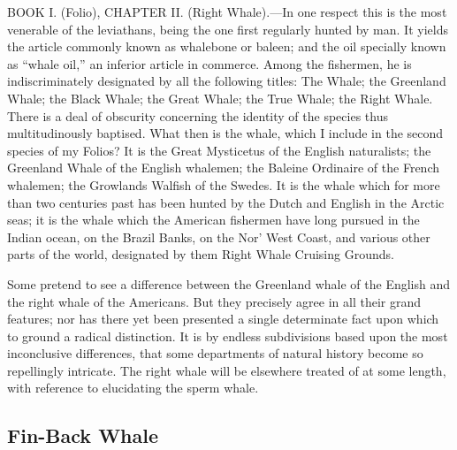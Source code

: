 BOOK I. (Folio), CHAPTER II. (Right Whale).—In one respect this is the most venerable of the leviathans, being the one first regularly hunted by man. It yields the article commonly known as whalebone or baleen; and the oil specially known as “whale oil,” an inferior article in commerce. Among the fishermen, he is indiscriminately designated by all the following titles: The Whale; the Greenland Whale; the Black Whale; the Great Whale; the True Whale; the Right Whale. There is a deal of obscurity concerning the identity of the species thus multitudinously baptised. What then is the whale, which I include in the second species of my Folios? It is the Great Mysticetus of the English naturalists; the Greenland Whale of the English whalemen; the Baleine Ordinaire of the French whalemen; the Growlands Walfish of the Swedes. It is the whale which for more than two centuries past has been hunted by the Dutch and English in the Arctic seas; it is the whale which the American fishermen have long pursued in the Indian ocean, on the Brazil Banks, on the Nor’ West Coast, and various other parts of the world, designated by them Right Whale Cruising Grounds.

Some pretend to see a difference between the Greenland whale of the English and the right whale of the Americans. But they precisely agree in all their grand features; nor has there yet been presented a single determinate fact upon which to ground a radical distinction. It is by endless subdivisions based upon the most inconclusive differences, that some departments of natural history become so repellingly intricate. The right whale will be elsewhere treated of at some length, with reference to elucidating the sperm whale.

\subsection{Fin-Back Whale}

